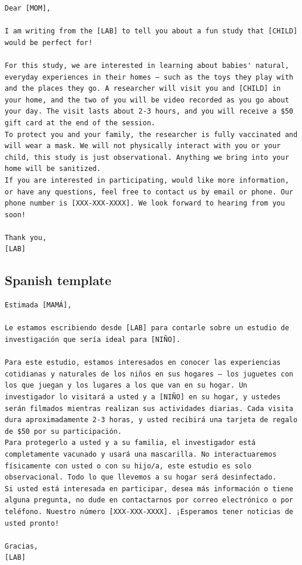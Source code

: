 \documentclass[
]{book}
\begin{document}
\begin{verbatim}
Dear [MOM],
  
I am writing from the [LAB] to tell you about a fun study that [CHILD] would be perfect for!

For this study, we are interested in learning about babies' natural, everyday experiences in their homes — such as the toys they play with and the places they go. A researcher will visit you and [CHILD] in your home, and the two of you will be video recorded as you go about your day. The visit lasts about 2-3 hours, and you will receive a $50 gift card at the end of the session.
To protect you and your family, the researcher is fully vaccinated and will wear a mask. We will not physically interact with you or your child, this study is just observational. Anything we bring into your home will be sanitized.
If you are interested in participating, would like more information, or have any questions, feel free to contact us by email or phone. Our phone number is [XXX-XXX-XXXX]. We look forward to hearing from you soon!

Thank you, 
[LAB]
\end{verbatim}

\hypertarget{spanish-template}{%
\subsection*{Spanish template}\label{spanish-template}}

\begin{verbatim}
Estimada [MAMÁ],

Le estamos escribiendo desde [LAB] para contarle sobre un estudio de investigación que sería ideal para [NIÑO].

Para este estudio, estamos interesados en conocer las experiencias cotidianas y naturales de los niños en sus hogares – los juguetes con los que juegan y los lugares a los que van en su hogar. Un investigador lo visitará a usted y a [NIÑO] en su hogar, y ustedes serán filmados mientras realizan sus actividades diarias. Cada visita dura aproximadamente 2-3 horas, y usted recibirá una tarjeta de regalo de $50 por su participación.
Para protegerlo a usted y a su familia, el investigador está completamente vacunado y usará una mascarilla. No interactuaremos físicamente con usted o con su hijo/a, este estudio es solo observacional. Todo lo que llevemos a su hogar será desinfectado.
Si usted está interesada en participar, desea más información o tiene alguna pregunta, no dude en contactarnos por correo electrónico o por teléfono. Nuestro número [XXX-XXX-XXXX]. ¡Esperamos tener noticias de usted pronto!

Gracias,
[LAB]
\end{verbatim}
\end{document}
